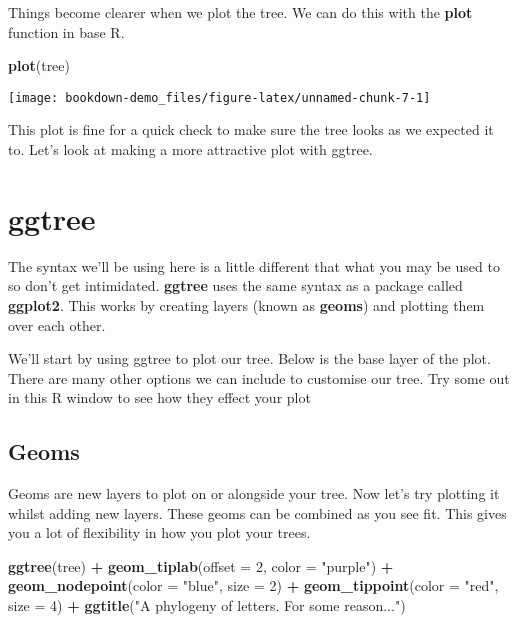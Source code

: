 \documentclass[]{book}
\newenvironment{Shaded}{\begin{snugshade}}{\end{snugshade}}
\newcommand{\KeywordTok}[1]{\textcolor[rgb]{0.13,0.29,0.53}{\textbf{#1}}}
\newcommand{\DataTypeTok}[1]{\textcolor[rgb]{0.13,0.29,0.53}{#1}}
\newcommand{\DecValTok}[1]{\textcolor[rgb]{0.00,0.00,0.81}{#1}}
\newcommand{\StringTok}[1]{\textcolor[rgb]{0.31,0.60,0.02}{#1}}
\newcommand{\OperatorTok}[1]{\textcolor[rgb]{0.81,0.36,0.00}{\textbf{#1}}}
\newcommand{\NormalTok}[1]{#1}
\begin{document}
Things become clearer when we plot the tree. We can do this with the
\textbf{plot} function in base R.

\begin{Shaded}
\begin{Highlighting}[]
\KeywordTok{plot}\NormalTok{(tree)}
\end{Highlighting}
\end{Shaded}

\begin{center}\texttt{[image: bookdown-demo\_files/figure-latex/unnamed-chunk-7-1]} \end{center}

This plot is fine for a quick check to make sure the tree looks as we
expected it to. Let's look at making a more attractive plot with ggtree.

\section{ggtree}\label{ggtree}

The syntax we'll be using here is a little different that what you may
be used to so don't get intimidated. \textbf{ggtree} uses the same
syntax as a package called \textbf{ggplot2}. This works by creating
layers (known as \textbf{geoms}) and plotting them over each other.

We'll start by using ggtree to plot our tree. Below is the base layer of
the plot. There are many other options we can include to customise our
tree. Try some out in this R window to see how they effect your plot

\subsection{Geoms}\label{geoms}

Geoms are new layers to plot on or alongside your tree. Now let's try
plotting it whilst adding new layers. These geoms can be combined as you
see fit. This gives you a lot of flexibility in how you plot your trees.

\begin{Shaded}
\begin{Highlighting}[]
\KeywordTok{ggtree}\NormalTok{(tree) }\OperatorTok{+}\StringTok{ }
\StringTok{  }\KeywordTok{geom_tiplab}\NormalTok{(}\DataTypeTok{offset =} \DecValTok{2}\NormalTok{, }\DataTypeTok{color =} \StringTok{"purple"}\NormalTok{) }\OperatorTok{+}
\StringTok{  }\KeywordTok{geom_nodepoint}\NormalTok{(}\DataTypeTok{color =} \StringTok{"blue"}\NormalTok{, }\DataTypeTok{size =} \DecValTok{2}\NormalTok{) }\OperatorTok{+}
\StringTok{  }\KeywordTok{geom_tippoint}\NormalTok{(}\DataTypeTok{color =} \StringTok{"red"}\NormalTok{, }\DataTypeTok{size =} \DecValTok{4}\NormalTok{) }\OperatorTok{+}
\StringTok{  }\KeywordTok{ggtitle}\NormalTok{(}\StringTok{"A phylogeny of letters. For some reason..."}\NormalTok{)}
\end{Highlighting}
\end{Shaded}
\end{document}
